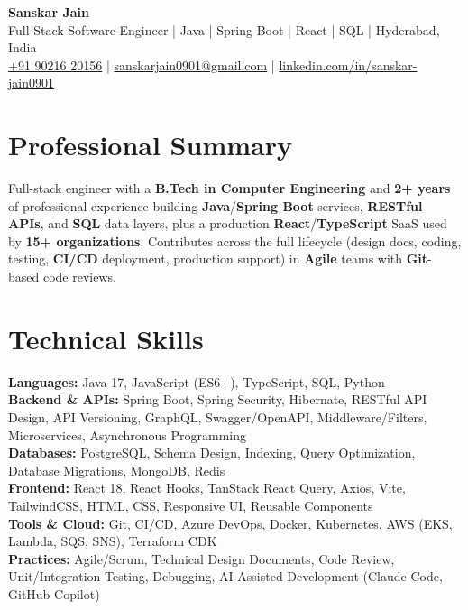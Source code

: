 \documentclass[a4paper,10pt]{article}
\begin{document}
\begin{center}
    {\LARGE \textbf{Sanskar Jain}} \\
    \vspace{2pt}
    Full-Stack Software Engineer \;|\; Java \;|\; Spring Boot \;|\; React \;|\; SQL \;|\; Hyderabad, India \\
    \vspace{2pt}
    \href{tel:+919021620156}{+91 90216 20156} \;|\;
    \href{mailto:sanskarjain0901@gmail.com}{sanskarjain0901@gmail.com} \;|\;
    \href{https://www.linkedin.com/in/sanskar-jain0901/}{linkedin.com/in/sanskar-jain0901}
\end{center}

\section*{Professional Summary}
Full-stack engineer with a \textbf{B.Tech in Computer Engineering} and \textbf{2+ years} of professional experience building \textbf{Java}/\textbf{Spring Boot} services, \textbf{RESTful APIs}, and \textbf{SQL} data layers, plus a production \textbf{React}/\textbf{TypeScript} SaaS used by \textbf{15+ organizations}.
Contributes across the full lifecycle (design docs, coding, testing, \textbf{CI/CD} deployment, production support) in \textbf{Agile} teams with \textbf{Git}-based code reviews.

\section*{Technical Skills}
\begin{sloppypar}
\noindent
\textbf{Languages:} Java 17, JavaScript (ES6+), TypeScript, SQL, Python \\
\textbf{Backend \& APIs:} Spring Boot, Spring Security, Hibernate, RESTful API Design, API Versioning, GraphQL, Swagger/OpenAPI, Middleware/Filters, Microservices, Asynchronous Programming \\
\textbf{Databases:} PostgreSQL, Schema Design, Indexing, Query Optimization, Database Migrations, MongoDB, Redis \\
\textbf{Frontend:} React 18, React Hooks, TanStack React Query, Axios, Vite, TailwindCSS, HTML, CSS, Responsive UI, Reusable Components \\
\textbf{Tools \& Cloud:} Git, CI/CD, Azure DevOps, Docker, Kubernetes, AWS (EKS, Lambda, SQS, SNS), Terraform CDK \\
\textbf{Practices:} Agile/Scrum, Technical Design Documents, Code Review, Unit/Integration Testing, Debugging, AI-Assisted Development (Claude Code, GitHub Copilot)
\end{sloppypar}
\end{document}
